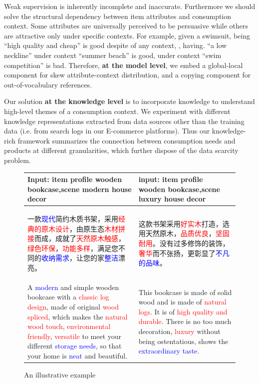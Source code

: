 \documentclass[sigconf]{acmart}
\begin{document}
Weak supervision is inherently incomplete and inaccurate.
Furthermore we should solve the structural dependency between item attributes and consumption context. Some attributes are universally perceived to be persuasive while others are attractive only under specific contexts. For example, given a swimsuit, being ``high quality and cheap'' is good despite of any context, , having. ``a low neckline'' under context ``summer beach'' is good, under context ``swim competition'' is bad. 
Therefore, \textbf{at the model level}, we embed a global-local component for skew attribute-context distribution, and a copying component for out-of-vocabulary references.

Our solution \textbf{at the knowledge level} is to incorporate knowledge to understand high-level themes of a consumption context. 
We experiment with different knowledge representations extracted from data sources other than the training data (i.e. from search logs in our E-commerce platforms).
Thus our knowledge-rich framework summarizes the connection between consumption needs and products at different granularities, which further dispose of the data scarcity problem.

\begin{figure}\label{fig:example}
  \caption{An illustrative example}
  \label{table:example}
  \begin{tabular}{p{8cm} p{8cm}}
    \toprule
    Input: item profile wooden bookcase,scene modern house decor & input: item profile wooden bookcase,scene luxury house decor \\
    \midrule
    \begin{CJK*}{UTF8}{gbsn}
        一款\textcolor{blue}{现代}简约木质书架，采用\textcolor{red}{经典的原木设计}，由原生态\textcolor{red}{木材拼接}而成，成就了\textcolor{red}{天然原木触感}，\textcolor{red}{绿色环保}，\textcolor{red}{功能多样}，满足您不同的\textcolor{blue}{收纳需求}，让您的家\textcolor{blue}{整洁}漂亮。
    \end{CJK*} & 
    \begin{CJK*}{UTF8}{gbsn}
        这款书架采用\textcolor{red}{好实木}打造，选用天然原木，\textcolor{red}{品质优良}，\textcolor{red}{坚固耐用}。没有过多修饰的装饰，\textcolor{red}{奢华}而不张扬，更彰显了\textcolor{blue}{不凡的品味}。 
    \end{CJK*}\\
    A \textcolor{blue}{modern} and simple wooden bookcase with a \textcolor{red}{classic log design}, made of original \textcolor{red}{wood spliced}, which makes the \textcolor{red}{ natural wood touch}, \textcolor{red}{environmental friendly}, \textcolor{red}{versatile} to meet your different \textcolor{blue}{storage needs}, so that your home is \textcolor{blue}{neat} and beautiful.  &
    This bookcase is made of solid wood and is made of\textcolor{red}{ natural logs}. It is of \textcolor{red}{ high quality and durable}. There is no too much decoration, \textcolor{red}{luxury} without being ostentatious, shows the \textcolor{blue}{extraordinary taste}.\\
    \bottomrule
\end{tabular}
\end{figure}
\end{document}
